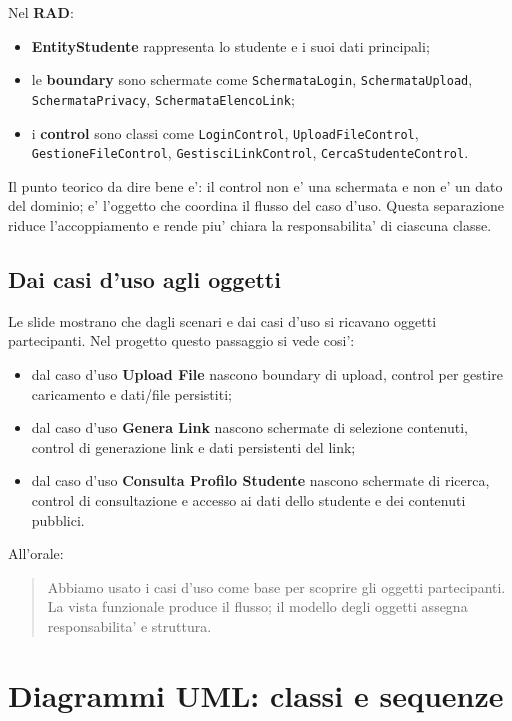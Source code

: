 ﻿\documentclass[11pt,a4paper]{article}
\newcommand{\doc}[1]{\textbf{#1}}
\newcommand{\term}[1]{\textbf{#1}}
\begin{document}
Nel \doc{RAD}:
\begin{itemize}
  \item \term{EntityStudente} rappresenta lo studente e i suoi dati principali;
  \item le \term{boundary} sono schermate come \texttt{SchermataLogin},
  \texttt{SchermataUpload}, \texttt{SchermataPrivacy}, \texttt{SchermataElencoLink};
  \item i \term{control} sono classi come \texttt{LoginControl},
  \texttt{UploadFileControl}, \texttt{GestioneFileControl},
  \texttt{GestisciLinkControl}, \texttt{CercaStudenteControl}.
\end{itemize}

Il punto teorico da dire bene e': il control non e' una schermata e non e' un dato del
dominio; e' l'oggetto che coordina il flusso del caso d'uso. Questa separazione riduce
l'accoppiamento e rende piu' chiara la responsabilita' di ciascuna classe.

\subsection{Dai casi d'uso agli oggetti}

Le slide mostrano che dagli scenari e dai casi d'uso si ricavano oggetti partecipanti.
Nel progetto questo passaggio si vede cosi':
\begin{itemize}
  \item dal caso d'uso \term{Upload File} nascono boundary di upload, control per
  gestire caricamento e dati/file persistiti;
  \item dal caso d'uso \term{Genera Link} nascono schermate di selezione contenuti,
  control di generazione link e dati persistenti del link;
  \item dal caso d'uso \term{Consulta Profilo Studente} nascono schermate di ricerca,
  control di consultazione e accesso ai dati dello studente e dei contenuti pubblici.
\end{itemize}

All'orale:
\begin{quote}
Abbiamo usato i casi d'uso come base per scoprire gli oggetti partecipanti. La vista
funzionale produce il flusso; il modello degli oggetti assegna responsabilita' e struttura.
\end{quote}

\section{Diagrammi UML: classi e sequenze}
\end{document}
